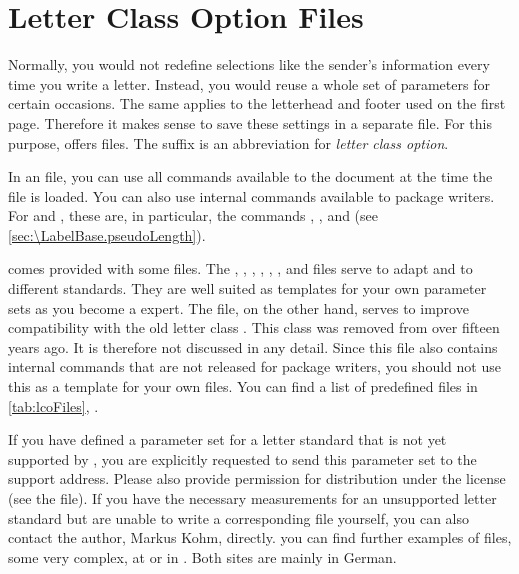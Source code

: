 \section{Letter Class Option Files}
%
\BeginIndexGroup
{}%
%

Normally, you would not redefine selections like the sender's information
every time you write a letter. Instead, you would reuse a whole set of
parameters for certain occasions. The same applies to the letterhead
and footer used on the first page. Therefore it makes sense to save these
settings in a separate file. For this purpose, \KOMAScript{} offers
 files. The  suffix is an abbreviation for
\emph{\emph{l}etter \emph{c}lass \emph{o}ption}.

In an  file, you can use all commands available to the document at
the time the  file is loaded. You can also use internal commands
available to package writers. For  and ,
these are, in particular, the commands
,
, and
 (see
\autoref{sec:\LabelBase.pseudoLength}).

\KOMAScript{} comes provided with some  files. The ,
, , , ,
, and 
files serve to adapt  and  to different
standards. They are well suited as templates for your own parameter sets as
you become a \KOMAScript{} expert. The  file, on the other
hand, serves to improve compatibility with the old letter class
. This class was removed from \KOMAScript{} over fifteen years
ago. It is therefore not discussed in any detail. Since this file also
contains internal commands that are not released for package writers, you
should not use this as a template for your own  files. You can find
a list of predefined  files in \autoref{tab:lcoFiles},
.

If you have defined a parameter set for a letter standard that is not yet
supported by \KOMAScript{}, you are explicitly requested to send this
parameter set to the \KOMAScript{} support address. Please also provide
permission for distribution under the \KOMAScript{} license (see the
 file). If you have the necessary measurements for an
unsupported letter standard but are unable to write a corresponding 
file yourself, you can also contact the \KOMAScript{} author, Markus Kohm,
directly. you can find further examples of  files, some very
complex, at \cite{homepage} or in \cite{DANTE:TK0203:MJK}. Both sites are
mainly in German.


